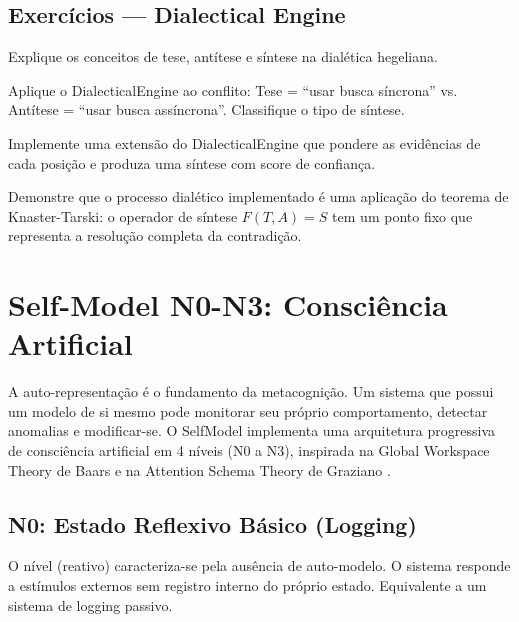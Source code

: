 \subsection{Exercícios — Dialectical Engine}
\begin{exercicio}
Explique os conceitos de tese, antítese e síntese na dialética
hegeliana.
\end{exercicio}
\begin{exercicio}
Aplique o DialecticalEngine ao conflito: Tese = ``usar busca
síncrona'' vs. Antítese = ``usar busca assíncrona''. Classifique o
tipo de síntese.
\end{exercicio}
\begin{exercicio}
Implemente uma extensão do DialecticalEngine que pondere as evidências
de cada posição e produza uma síntese com score de confiança.
\end{exercicio}
\begin{exercicio}
Demonstre que o processo dialético implementado é uma aplicação do
teorema de Knaster-Tarski: o operador de síntese $F(T, A) = S$ tem
um ponto fixo que representa a resolução completa da contradição.
\end{exercicio}

\section{Self-Model N0-N3: Consciência Artificial}
\label{sec:self-model}
\nivelphd

A auto-representação é o fundamento da metacognição. Um sistema que
possui um modelo de si mesmo pode monitorar seu próprio comportamento,
detectar anomalias e modificar-se. O SelfModel implementa uma
arquitetura progressiva de consciência artificial em 4 níveis (N0 a
N3), inspirada na Global Workspace Theory de Baars e na Attention
Schema Theory de Graziano \cite{metzinger2020minimal,
opencode2026spec036}.

\subsection{N0: Estado Reflexivo Básico (Logging)}

\begin{definicao}[Nível N0]
O nível  (reativo) caracteriza-se pela ausência de
auto-modelo. O sistema responde a estímulos externos sem registro
interno do próprio estado. Equivalente a um sistema de logging passivo.
\end{definicao}

